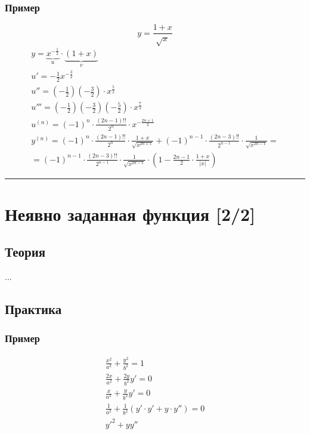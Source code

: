 \documentclass{article}
\begin{document}
\subsubsection{Пример}
\[
    y = \frac{1 + x}{\sqrt{x}}
\]
\begin{gather*}
    y = \underbrace{x^{-\frac{1}{2}}}_{u} \cdot \underbrace{(1 + x)}_{v} \\
    u' = -\frac{1}{2} x^{-\frac{3}{2}} \\
    u'' = \left( -\frac{1}{2} \right) \left( -\frac{3}{2} \right) \cdot x^{\frac{5}{2}} \\
    u''' = \left( -\frac{1}{2} \right) \left( -\frac{3}{2} \right) \left( -\frac{5}{2} \right) \cdot x^{\frac{7}{2}} \\
    u^{(n)} = (-1)^n \cdot \frac{(2n - 1)!!}{2^n} \cdot x^{-\frac{2n + 1}{2}} \\
    y^{(n)} = (-1)^n \cdot \frac{(2n - 1)!!}{2^n} \cdot \frac{1 + x}{\sqrt{x^{2n + 1}}} + (-1)^{n - 1} \cdot \frac{(2n - 3)!!}{2^{n - 1}} \cdot \frac{1}{\sqrt{x^{2n - 1}}} = \\
    = (-1)^{n - 1} \cdot \frac{(2n - 3)!!}{2^{n - 1}} \cdot \frac{1}{\sqrt{x^{2n - 1}}} \cdot \left( 1 - \frac{2n - 1}{2}  \cdot \frac{1 + x}{|x|}\right)
\end{gather*}



\par\noindent\rule{\textwidth}{1pt}
\section{Неявно заданная функция [2/2]}

\subsection{Теория}
...

\subsection{Практика}

\subsubsection{Пример}
\begin{gather*}
    \frac{x^2}{a^2} + \frac{y^2}{b^2} = 1 \\
    \frac{2x}{a^2} + \frac{2y}{b^2}y' = 0 \\
    \frac{x}{a^2} + \frac{y}{b^2}y' = 0 \\
    \frac{1}{a^2} + \frac{1}{b^2} \left( y' \cdot y' + y \cdot y'' \right) = 0 \\
    y'^2 + yy''
\end{gather*}
\end{document}

